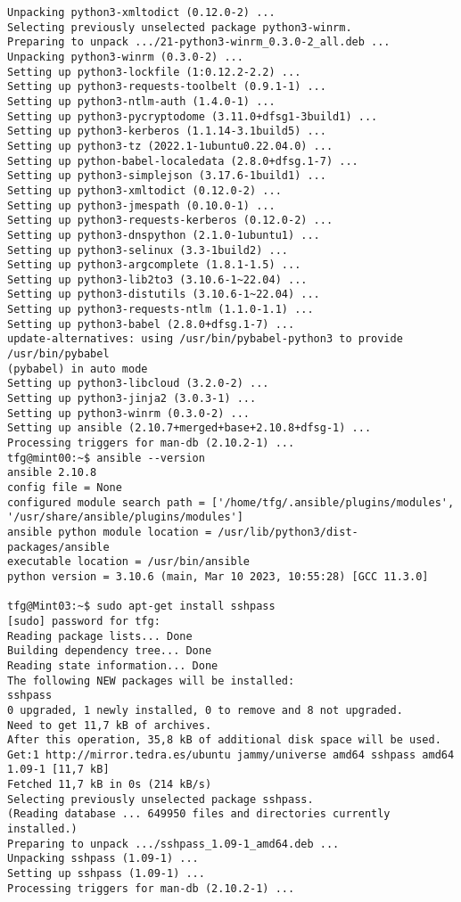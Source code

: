 \documentclass[../main.tex]{subfiles}
\begin{document}
\begin{lstlisting}
Unpacking python3-xmltodict (0.12.0-2) ...
Selecting previously unselected package python3-winrm.
Preparing to unpack .../21-python3-winrm_0.3.0-2_all.deb ...
Unpacking python3-winrm (0.3.0-2) ...
Setting up python3-lockfile (1:0.12.2-2.2) ...
Setting up python3-requests-toolbelt (0.9.1-1) ...
Setting up python3-ntlm-auth (1.4.0-1) ...
Setting up python3-pycryptodome (3.11.0+dfsg1-3build1) ...
Setting up python3-kerberos (1.1.14-3.1build5) ...
Setting up python3-tz (2022.1-1ubuntu0.22.04.0) ...
Setting up python-babel-localedata (2.8.0+dfsg.1-7) ...
Setting up python3-simplejson (3.17.6-1build1) ...
Setting up python3-xmltodict (0.12.0-2) ...
Setting up python3-jmespath (0.10.0-1) ...
Setting up python3-requests-kerberos (0.12.0-2) ...
Setting up python3-dnspython (2.1.0-1ubuntu1) ...
Setting up python3-selinux (3.3-1build2) ...
Setting up python3-argcomplete (1.8.1-1.5) ...
Setting up python3-lib2to3 (3.10.6-1~22.04) ...
Setting up python3-distutils (3.10.6-1~22.04) ...
Setting up python3-requests-ntlm (1.1.0-1.1) ...
Setting up python3-babel (2.8.0+dfsg.1-7) ...
update-alternatives: using /usr/bin/pybabel-python3 to provide /usr/bin/pybabel 
(pybabel) in auto mode
Setting up python3-libcloud (3.2.0-2) ...
Setting up python3-jinja2 (3.0.3-1) ...
Setting up python3-winrm (0.3.0-2) ...
Setting up ansible (2.10.7+merged+base+2.10.8+dfsg-1) ...
Processing triggers for man-db (2.10.2-1) ...
tfg@mint00:~$ ansible --version
ansible 2.10.8
config file = None
configured module search path = ['/home/tfg/.ansible/plugins/modules', '/usr/share/ansible/plugins/modules']
ansible python module location = /usr/lib/python3/dist-packages/ansible
executable location = /usr/bin/ansible
python version = 3.10.6 (main, Mar 10 2023, 10:55:28) [GCC 11.3.0]

tfg@Mint03:~$ sudo apt-get install sshpass
[sudo] password for tfg:        
Reading package lists... Done
Building dependency tree... Done
Reading state information... Done
The following NEW packages will be installed:
sshpass
0 upgraded, 1 newly installed, 0 to remove and 8 not upgraded.
Need to get 11,7 kB of archives.
After this operation, 35,8 kB of additional disk space will be used.
Get:1 http://mirror.tedra.es/ubuntu jammy/universe amd64 sshpass amd64 1.09-1 [11,7 kB]
Fetched 11,7 kB in 0s (214 kB/s)    
Selecting previously unselected package sshpass.
(Reading database ... 649950 files and directories currently installed.)
Preparing to unpack .../sshpass_1.09-1_amd64.deb ...
Unpacking sshpass (1.09-1) ...
Setting up sshpass (1.09-1) ...
Processing triggers for man-db (2.10.2-1) ...
\end{lstlisting}
\end{document}
